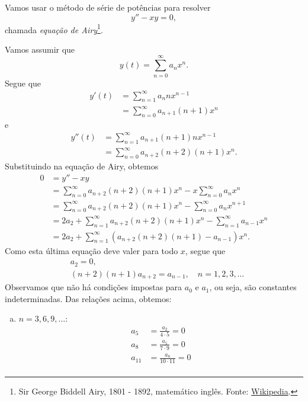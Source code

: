 \begin{ex}
  Vamos usar o método de série de potências para resolver
  \begin{equation}
    y'' - xy = 0,
  \end{equation}
  chamada \emph{equação de Airy}\footnote{Sir George Biddell Airy, 1801 - 1892, matemático inglês. Fonte: \href{https://en.wikipedia.org/wiki/George_Biddell_Airy}{Wikipedia}.}.

  Vamos assumir que
  \begin{equation}
    y(t) = \sum_{n=0}^{\infty} a_nx^n.
  \end{equation}
  Segue que
  \begin{align}
    y'(t) &= \sum_{n=1}^\infty a_{n}nx^{n-1} \\
    &= \sum_{n=0}^\infty a_{n+1}(n+1)x^n
  \end{align}
  e
  \begin{align}
    y''(t) &= \sum_{n=1}^\infty a_{n+1}(n+1)nx^{n-1} \\
    &= \sum_{n=0}^\infty a_{n+2}(n+2)(n+1)x^n.
  \end{align}
  Substituindo na equação de Airy, obtemos
  \begin{align}
    0 &= y'' - xy \\
    &= \sum_{n=0}^\infty a_{n+2}(n+2)(n+1)x^n - x\sum_{n=0}^\infty a_{n}x^n \\
    &= \sum_{n=0}^\infty a_{n+2}(n+2)(n+1)x^n - \sum_{n=0}^\infty a_{n}x^{n+1} \\
    &= 2a_2 + \sum_{n=1}^\infty a_{n+2}(n+2)(n+1)x^n - \sum_{n=1}^\infty a_{n-1}x^{n} \\
    &= 2a_2 + \sum_{n=1}^\infty (a_{n+2}(n+2)(n+1) - a_{n-1})x^n.
  \end{align}
  Como esta última equação deve valer para todo $x$, segue que
  \begin{align}
    & a_2 = 0, \\
    & (n+2)(n+1)a_{n+2} = a_{n-1},\quad n=1, 2, 3, \ldots
  \end{align}
  Observamos que não há condições impostas para $a_0$ e $a_1$, ou seja, são constantes indeterminadas. Das relações acima, obtemos:
  \begin{enumerate}[a)]
  \item $n = 3, 6, 9, \ldots$:
    \begin{align}
      a_5 &= \frac{a_2}{4\cdot 5} = 0 \\
      a_8 &= \frac{a_5}{7\cdot 9} = 0 \\
      a_{11} &= \frac{a_{8}}{10\cdot 11} = 0 \\

\end{align}
\end{enumerate}
\end{ex}
